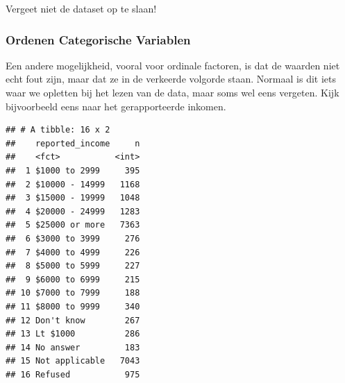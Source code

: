 \documentclass[]{tufte-book}
\newenvironment{Shaded}{}{}
\newcommand{\DataTypeTok}[1]{\textcolor[rgb]{0.56,0.13,0.00}{#1}}
\newcommand{\KeywordTok}[1]{\textcolor[rgb]{0.00,0.44,0.13}{\textbf{#1}}}
\newcommand{\NormalTok}[1]{#1}
\newcommand{\OperatorTok}[1]{\textcolor[rgb]{0.40,0.40,0.40}{#1}}
\newcommand{\StringTok}[1]{\textcolor[rgb]{0.25,0.44,0.63}{#1}}
\begin{document}
\begin{Shaded}
\end{Shaded}

Vergeet niet de dataset op te slaan!

\hypertarget{ordenen-categorische-variablen}{%
\subsubsection{Ordenen Categorische Variablen}\label{ordenen-categorische-variablen}}

Een andere mogelijkheid, vooral voor ordinale factoren, is dat de waarden niet echt fout zijn, maar dat ze in de verkeerde volgorde staan. Normaal is dit iets waar we opletten bij het lezen van de data, maar soms wel eens vergeten. Kijk bijvoorbeeld eens naar het gerapporteerde inkomen.

\begin{Shaded}
\end{Shaded}

\begin{verbatim}
## # A tibble: 16 x 2
##    reported_income     n
##    <fct>           <int>
##  1 $1000 to 2999     395
##  2 $10000 - 14999   1168
##  3 $15000 - 19999   1048
##  4 $20000 - 24999   1283
##  5 $25000 or more   7363
##  6 $3000 to 3999     276
##  7 $4000 to 4999     226
##  8 $5000 to 5999     227
##  9 $6000 to 6999     215
## 10 $7000 to 7999     188
## 11 $8000 to 9999     340
## 12 Don't know        267
## 13 Lt $1000          286
## 14 No answer         183
## 15 Not applicable   7043
## 16 Refused           975
\end{verbatim}
\end{document}
